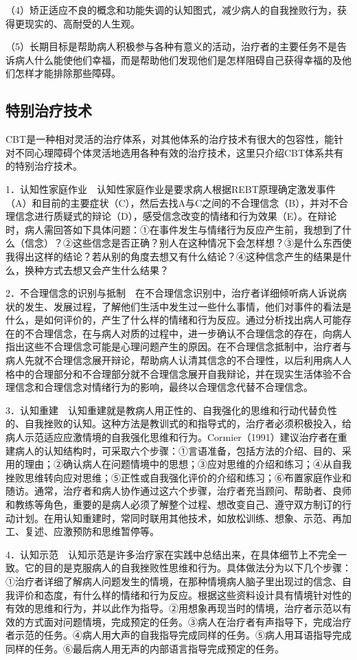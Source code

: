 （4）矫正适应不良的概念和功能失调的认知图式，减少病人的自我挫败行为，获得更现实的、高耐受的人生观。

（5）长期目标是帮助病人积极参与各种有意义的活动，治疗者的主要任务不是告诉病人什么能使他们幸福，而是帮助他们发现他们是怎样阻碍自己获得幸福的及他们怎样才能排除那些障碍。

\subsection{特别治疗技术}

CBT是一种相对灵活的治疗体系，对其他体系的治疗技术有很大的包容性，能针对不同心理障碍个体灵活地选用各种有效的治疗技术，这里只介绍CBT体系共有的特别治疗技术。

1．认知性家庭作业　认知性家庭作业是要求病人根据REBT原理确定激发事件（A）和目前的主要症状（C），然后去找A与C之间的不合理信念（B），并对不合理信念进行质疑式的辩论（D），感受信念改变的情绪和行为效果（E）。在辩论时，病人需回答如下具体问题：①在事件发生与情绪行为反应产生前，我想到了什么（信念）？②这些信念是否正确？别人在这种情况下会怎样想？③是什么东西使我得出这样的结论？若从别的角度去想又有什么结论？④这种信念产生的结果是什么，换种方式去想又会产生什么结果？

2．不合理信念的识别与抵制　在不合理信念识别中，治疗者详细倾听病人诉说病状的发生、发展过程，了解他们生活中发生过一些什么事情，他们对事件的看法是什么，是如何评价的，产生了什么样的情绪和行为反应。通过分析找出病人可能存在的不合理信念，在与病人对质的过程中，进一步确认不合理信念的存在，向病人指出这些不合理信念可能是心理问题产生的原因。在不合理信念抵制中，治疗者与病人先就不合理信念展开辩论，帮助病人认清其信念的不合理性，以后利用病人人格中的合理部分和不合理部分就不合理信念展开自我辩论，并在现实生活体验不合理信念和合理信念对情绪行为的影响，最终以合理信念代替不合理信念。

3．认知重建　认知重建就是教病人用正性的、自我强化的思维和行动代替负性的、自我挫败的认知。这种方法是教训式的和指导式的，治疗者必须积极投入，给病人示范适应应激情境的自我强化思维和行为。Cormier（1991）建议治疗者在重建病人的认知结构时，可采取六个步骤：①言语准备，包括方法的介绍、目的、采用的理由；②确认病人在问题情境中的思想；③应对思维的介绍和练习；④从自我挫败思维转向应对思维；⑤正性或自我强化评价的介绍和练习；⑥布置家庭作业和随访。通常，治疗者和病人协作通过这六个步骤，治疗者充当顾问、帮助者、良师和教练等角色，重要的是病人必须了解整个过程、想改变自己、遵守双方制订的行动计划。在用认知重建时，常同时联用其他技术，如放松训练、想象、示范、再加工、复述、应激预防和思维暂停等。

4．认知示范　认知示范是许多治疗家在实践中总结出来，在具体细节上不完全一致。它的目的是克服病人的自我挫败性思维和行为。具体做法分为以下几个步骤：①治疗者详细了解病人问题发生的情境，在那种情境病人脑子里出现过的信念、自我评价和态度，有什么样的情绪和行为反应。根据这些资料设计具有情境针对性的有效的思维和行为，并以此作为指导。②用想象再现当时的情境，治疗者示范以有效的方式面对问题情境，完成预定的任务。③病人在治疗者有声指导下，完成治疗者示范的任务。④病人用大声的自我指导完成同样的任务。⑤病人用耳语指导完成同样的任务。⑥最后病人用无声的内部语言指导完成预定的任务。

